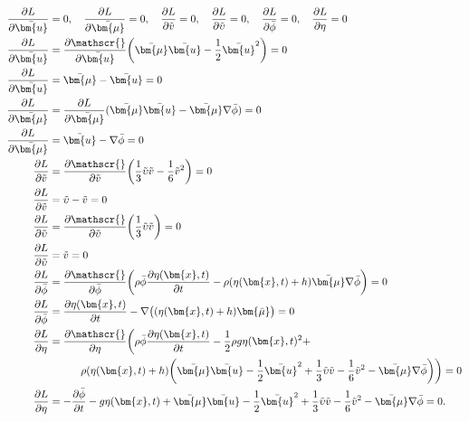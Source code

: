 \begin{align}
\frac{\partial L}{\partial \bar{\bm{u}}} &= 0
,\quad
\frac{\partial L}{\partial \bar{\bm{\mu}}} = 0
,\quad
\frac{\partial L}{\partial \tilde{v}} = 0
,\quad
\frac{\partial L}{\partial \tilde{\upsilon}} = 0
,\quad
\frac{\partial L}{\partial \bar{\phi}} = 0
,\quad
\frac{\partial L}{\partial \eta} = 0
\notag
\\
\frac{\partial L}{\partial \bar{\bm{u}}}
&=
\frac{\partial \mathscr{}}{\partial \bar{\bm{u}}}
\biggl(\bar{\bm{\mu}}\bar{\bm{u}} - \frac{1}{2} \bar{\bm{u}}^2\biggr)
= 0
\nonumber \\ 
\frac{\partial L}{\partial \bar{\bm{u}}}
&=
\bar{\bm{\mu}} - \bar{\bm{u}}
= 0
\label{luke:Variation_nach_u} 
\\
\frac{\partial L}{\partial \bar{\bm{\mu}}}
&=
\frac{\partial L}{\partial \bar{\bm{\mu}}}
( \bar{\bm{\mu}}\bar{\bm{u}}-\bar{\bm{\mu}}\nabla \bar{\phi} )
= 0
\nonumber \\
\frac{\partial L}{\partial \bar{\bm{\mu}}}
&=
\bar{\bm{u}}-\nabla \bar{\phi}
= 0
\label{luke:Variation_nach_mu}
\\
\frac{\partial L}{\partial \tilde{v}}
&=
\frac{\partial \mathscr{}}{\partial \tilde{v}}
\biggl(\frac{1}{3} \tilde{\upsilon}\tilde{v} - \frac{1}{6} \tilde{v}^2\biggr)
= 0
\nonumber \\
\frac{\partial L}{\partial \tilde{v}}
&=
\tilde{\upsilon}-\tilde{v}
= 0
\label{luke:Variation_nach_v}
\\
\frac{\partial L}{\partial \tilde{\upsilon}}
&=
\frac{\partial \mathscr{}}{\partial \tilde{\upsilon}}
\biggl(\frac{1}{3} \tilde{\upsilon}\tilde{v}\biggr)
= 0
\nonumber \\	
\frac{\partial L}{\partial \tilde{\upsilon}}
&=
\tilde{v}
= 0
\label{luke:Variation_nach_upsilon}
\\
\frac{\partial L}{\partial \bar{\phi}}
&=
\frac{\partial \mathscr{}}{\partial \bar{\phi}}
\biggl(
\rho\bar{\phi}\frac{\partial \eta(\bm{x}, t)}{\partial t}
-
\rho(\eta(\bm{x}, t) + h)\bar{\bm{\mu}}\nabla \bar{\phi}
\biggr)
= 0
\nonumber \\
\frac{\partial L}{\partial \bar{\phi}}
&=
\frac{\partial \eta(\bm{x}, t)}{\partial t} -
\nabla\bigl((\eta(\bm{x}, t)+ h)\bm{\bar{\mu}}\bigr)
= 0
\label{luke:Variation_nach_phi}
\\
\frac{\partial L}{\partial \eta}
&=
\frac{\partial \mathscr{}}{\partial \eta}
\bigg(\rho\bar{\phi}\frac{\partial \eta(\bm{x}, t)}{\partial t}
-
\frac{1}{2} \rho g \eta(\bm{x}, t)^2
+
\nonumber \\
&\qquad\quad
\rho(\eta(\bm{x}, t) + h)
\biggl(
\bar{\bm{\mu}}\bar{\bm{u}}
-
\frac{1}{2} \bar{\bm{u}}^2 
+
\frac{1}{3} \tilde{\upsilon}\tilde{v}
-
\frac{1}{6}\tilde{v}^2
-
\bar{\bm{\mu}}\nabla \bar{\phi}
\biggr)
\bigg)
= 0
\nonumber \\
\frac{\partial L}{\partial \eta}
&=
-
\frac{\partial \bar{\phi}}{\partial t}
-
g\eta(\bm{x}, t)
+
\bar{\bm{\mu}}\bar{\bm{u}}
-
\frac{1}{2} \bar{\bm{u}}^2 
+
\frac{1}{3} \tilde{\upsilon}\tilde{v}
-
\frac{1}{6}\tilde{v}^2
-
\bar{\bm{\mu}}\nabla \bar{\phi}
= 0.
\label{luke:Variation_nach_eta}
\end{align}

